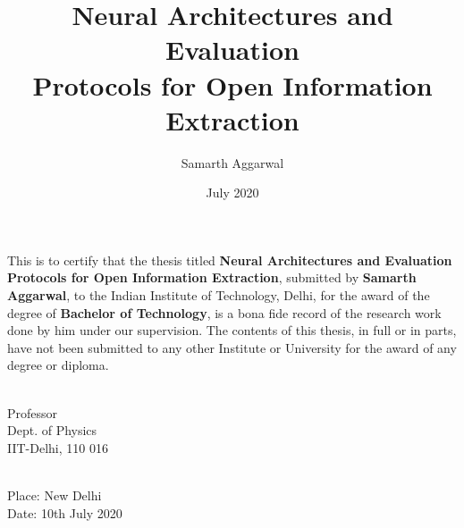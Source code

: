 \documentclass[BTech]{iitddiss}
\begin{document}

\title{Neural Architectures and Evaluation \\Protocols for Open Information Extraction}

\author{Samarth Aggarwal}
\date{July 2020}

\maketitle

\certificate

\vspace*{0.5in}

\noindent This is to certify that the thesis titled {\bf Neural Architectures and Evaluation Protocols for Open Information Extraction}, submitted by {\bf Samarth Aggarwal},
  to the Indian Institute of Technology, Delhi, for
the award of the degree of {\bf Bachelor of Technology}, is a bona fide
record of the research work done by him under our supervision.  The
contents of this thesis, in full or in parts, have not been submitted
to any other Institute or University for the award of any degree or
diploma.

\vspace*{1.5in}

\begin{singlespacing}
\hspace*{-0.25in}
\parbox{2.5in}{
 \\
\noindent Professor \\
\noindent Dept. of Physics\\
\noindent IIT-Delhi, 110 016 \\
}
\hspace*{1.0in}
\end{singlespacing}
\vspace*{0.25in}\\
\noindent Place: New Delhi\\
Date: 10th July 2020


\acknowledgements


\pagebreak

\end{document}
